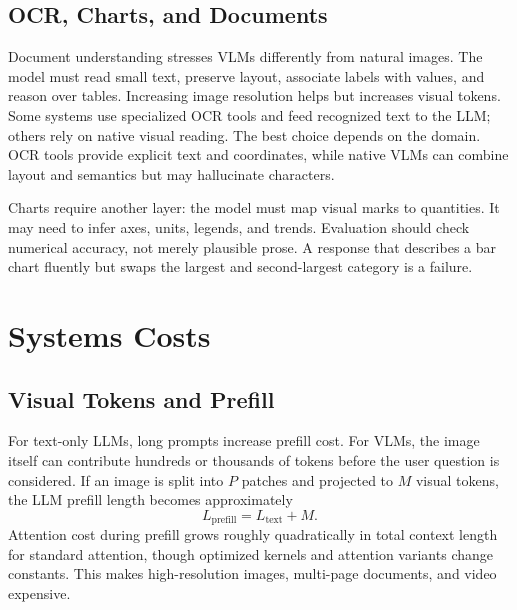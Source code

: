 \subsection{OCR, Charts, and Documents}
Document understanding stresses VLMs differently from natural images. The model must read small text, preserve layout, associate labels with values, and reason over tables. Increasing image resolution helps but increases visual tokens. Some systems use specialized OCR tools and feed recognized text to the LLM; others rely on native visual reading. The best choice depends on the domain. OCR tools provide explicit text and coordinates, while native VLMs can combine layout and semantics but may hallucinate characters.

Charts require another layer: the model must map visual marks to quantities. It may need to infer axes, units, legends, and trends. Evaluation should check numerical accuracy, not merely plausible prose. A response that describes a bar chart fluently but swaps the largest and second-largest category is a failure.

\section{Systems Costs}
\subsection{Visual Tokens and Prefill}
For text-only LLMs, long prompts increase prefill cost. For VLMs, the image itself can contribute hundreds or thousands of tokens before the user question is considered. If an image is split into $P$ patches and projected to $M$ visual tokens, the LLM prefill length becomes approximately
\[
    L_{\mathrm{prefill}}
    =
    L_{\mathrm{text}} + M.
\]
Attention cost during prefill grows roughly quadratically in total context length for standard attention, though optimized kernels and attention variants change constants. This makes high-resolution images, multi-page documents, and video expensive.

